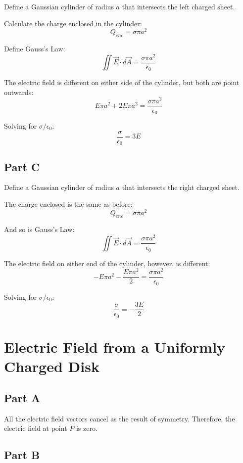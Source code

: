 \documentclass{article}
\begin{document}
Define a Gaussian cylinder of radius $a$ that intersects the left charged sheet.

\bigbreak

Calculate the charge enclosed in the cylinder:
$$ Q_{enc} = \sigma \pi a^{2} $$

Define Gauss's Law:
$$ \iint \vec{E} \cdot d\vec{A} = \frac{ \sigma \pi a^{2} }{ \epsilon_{0} } $$

The electric field is different on either side of the cylinder, but both are
point outwards:
$$ E \pi a^{2} + 2 E \pi a^{2} = \frac{ \sigma \pi a^{2} }{ \epsilon_{0} } $$

Solving for $\sigma / \epsilon_{0}$:
$$ \frac{ \sigma }{ \epsilon_{0} } = 3 E$$

\subsection*{Part C}

Define a Gaussian cylinder of radius $a$ that intersects the right charged sheet.

\bigbreak

The charge enclosed is the same as before:
$$ Q_{enc} = \sigma \pi a^{2} $$

And so is Gauss's Law:
$$ \iint \vec{E} \cdot d\vec{A} = \frac{ \sigma \pi a^{2} }{ \epsilon_{0} } $$

The electric field on either end of the cylinder, however, is different:
$$ -E \pi a^{2} - \frac{ E \pi a^{2} }{ 2 } = \frac{ \sigma \pi a^{2} }{
\epsilon_{0} } $$

Solving for $\sigma / \epsilon_0$:
$$ \frac{ \sigma }{ \epsilon_0 } = -\frac{ 3 E }{ 2 } $$

\section{Electric Field from a Uniformly Charged Disk}

\subsection*{Part A}

All the electric field vectors cancel as the result of symmetry. Therefore, the
electric field at point $P$ is zero.

\subsection*{Part B}
\end{document}
